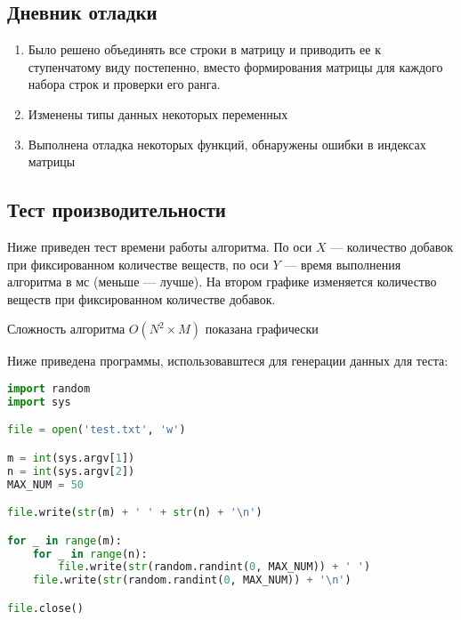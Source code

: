 \documentclass[12pt]{article}
\begin{document}
\subsection*{Дневник отладки}

\begin{enumerate}
    \item Было решено объединять все строки в матрицу и приводить ее к ступенчатому виду постепенно, вместо формирования матрицы для каждого набора строк и проверки его ранга.
    \item Изменены типы данных некоторых переменных
    \item Выполнена отладка некоторых функций, обнаружены ошибки в индексах
    матрицы
\end{enumerate}

\subsection*{Тест производительности}

Ниже приведен тест времени работы алгоритма. По оси $X$ — количество 
добавок при фиксированном количестве веществ, по оси $Y$ — время выполнения алгоритма в мс (меньше — лучше).
На втором графике изменяется количество веществ при фиксированном количестве добавок.




Сложность алгоритма $O(N^2 \times M)$ показана графически

Ниже приведена программы, использовавштеся для генерации данных для теста:

\begin{lstlisting}[language=Python]
import random
import sys

file = open('test.txt', 'w')

m = int(sys.argv[1])
n = int(sys.argv[2])
MAX_NUM = 50

file.write(str(m) + ' ' + str(n) + '\n')

for _ in range(m):
    for _ in range(n):
        file.write(str(random.randint(0, MAX_NUM)) + ' ')
    file.write(str(random.randint(0, MAX_NUM)) + '\n')

file.close()
\end{lstlisting}
\end{document}
